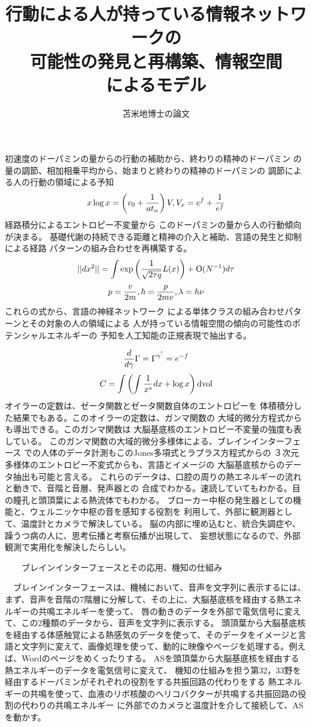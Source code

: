 \documentclass{jsarticle}
\begin{document}
\title{行動による人が持っている情報ネットワークの \\
可能性の発見と再構築、情報空間 \\
によるモデル}
\author{苫米地博士の論文}
\date{}
\maketitle

      初速度のドーパミンの量からの行動の補助から、終わりの精神のドーパミン
  の量の調節、相加相乗平均から、始まりと終わりの精神のドーパミンの
  調節による人の行動の領域による予知
  $$ x \log x = \left(v_0 + {1 \over at_n}\right)V, V_x = e^f + {1 \over e^f} $$
     経路積分によるエントロピー不変量から
  このドーパミンの量から人の行動傾向が決まる。
  基礎代謝の持続できる距離と精神の介入と補助、言語の発生と抑制による経路
  パターンの組み合わせを再構築する。
  $$ ||dx^2|| = \int {\mathrm{exp}\left({1 \over \sqrt{2 \tau q}}L(x)
  \right) + \mathrm{O}(N^{-1})}d \tau   $$
  $$ p = {v \over 2m}, \hbar = {p \over 2mv}, \lambda = h \nu $$
     これらの式から、言語の神経ネットワーク
  による単体クラスの組み合わせパターンとその対象の人の領域による
  人が持っている情報空間の傾向の可能性のポテンシャルエネルギーの
  予知を人工知能の正規表現で抽出する。
   
  $$ {d \over d \gamma}\Gamma = \Gamma^{{\gamma}^{'}} = e^{-f}  $$
  $$ C = \int \left(\int {1 \over x^s}dx + \log x \right)\mathrm{dvol} $$
     オイラーの定数は、ゼータ関数とゼータ関数自体のエントロピーを
  体積積分した結果でもある。このオイラーの定数は、ガンマ関数の
  大域的微分方程式からも導出できる。このガンマ関数は
  大脳基底核のエントロピー不変量の強度も表している。
  このガンマ関数の大域的微分多様体による、ブレインインターフェース
  での人体のデータ計測もこのJones多項式とラプラス方程式からの
  ３次元多様体のエントロピー不変式からも、言語とイメージの
  大脳基底核からのデータ抽出も可能と言える。
  これらのデータは、口腔の周りの熱エネルギーの流れと動きで、音階と音層、発声器との
  合成でわかる。速読していてもわかる。目の瞳孔と頭頂葉による熱流体でもわかる。
  ブローカー中枢の発生器としての機能と、ウェルニッケ中枢の音を感知する役割を
  利用して、外部に観測器として、温度計とカメラで解決している。
  脳の内部に埋め込むと、統合失調症や、躁うつ病の人に、思考伝播と考察伝播が出現して、
  妄想状態になるので、外部観測で実用化を解決したらしい。


　　ブレインインターフェースとその応用、機知の仕組み



　ブレインインターフェースは、機械において、音声を文字列に表示するには、
まず、音声を音階の7階層に分解して、その上に、大脳基底核を経由する熱エネルギーの共鳴エネルギーを使って、
唇の動きのデータを外部で電気信号に変えて、この2種類のデータから、音声を文字列に表示する。
頭頂葉から大脳基底核を経由する体感触覚による熱感気のデータを使って、そのデータをイメージと言語と文字列に変えて、画像処理を使って、動的に映像やページを処理する。例えば、Wordのページをめくったりする。
ASを頭頂葉から大脳基底核を経由する熱エネルギーのデータを電気信号に変えて、
機知の仕組みを担う第32，33野を経由するドーパミンがそれぞれの役割をする共振回路の代わりをする
熱エネルギーの共鳴を使って、血液のリボ核酸のヘリコバクターが共鳴する共振回路の役割の代わりの共鳴エネルギー
に外部でのカメラと温度計を介して接続して、ASを動かす。
\end{document}

